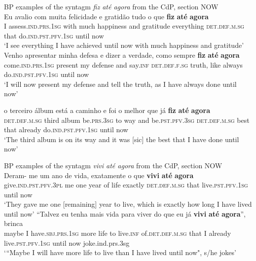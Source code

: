\documentclass[output=paper,colorlinks,citecolor=brown]{langscibook}
\begin{document}
\ea\label{ex:rb22}
    BP examples of the syntagm \textit{fiz até agora} from the CdP, section NOW\\
 \ea\label{ex:rb22a}
 \gll Eu avalio com muita felicidade e gratidão tudo o que \textbf{fiz} \textbf{até} \textbf{agora}\\
 I assess.\textsc{ind.prs.1sg} with much happiness and gratitude everything \textsc{det.def.m.sg} that do.\textsc{ind.pst.pfv.1sg} until now\\
 \glt ‘I see everything I have achieved until now with much happiness and gratitude’\\
  \ex\label{ex:rb22b}
  \gll Venho apresentar minha defesa e dizer a verdade, como sempre \textbf{fiz} \textbf{até} \textbf{agora}\\
  come.\textsc{ind.prs.1sg} present my defense and say.\textsc{inf} \textsc{det.def.f.sg} truth, like always do.\textsc{ind.pst.pfv.1sg} until now\\
  \glt ‘I will now present my defense and tell the truth, as I have always done until now’

   \ex\label{ex:rb22c}
   \gll o terceiro álbum está a caminho e foi o melhor que já \textbf{fiz} \textbf{até} \textbf{agora}\\
   \textsc{det.def.m.sg} third album be.\textsc{prs.3sg} to way and be.\textsc{pst.pfv.3sg} \textsc{det.def.m.sg} best that already do.\textsc{ind.pst.pfv.1sg} until now\\
   \glt ‘The third album is on its way and it was [sic] the best that I have done until now’
 \z
\z

\ea\label{ex:rb23}
BP examples of the syntagm \textit{vivi até agora} from the CdP, section NOW\\
 \ea\label{ex:rb23a}
  \gll Deram- me um ano de vida, exatamente o que \textbf{vivi} \textbf{até} \textbf{agora}\\
  give.\textsc{ind.pst.pfv.3pl} me one year of life exactly \textsc{det.def.m.sg} that live.\textsc{pst.pfv.1sg} until now\\
  \glt ‘They gave me one [remaining] year to live, which is exactly how long I have lived until now’
  \pagebreak
  \ex\label{ex:rb23b}
  \gll “Talvez eu tenha mais vida para viver do que eu já \textbf{vivi} \textbf{até} \textbf{agora}”, brinca\\
  maybe I have.\textsc{sbj.prs.1sg} more life to live.\textsc{inf} of.\textsc{det.def.m.sg} that I already live.\textsc{pst.pfv.1sg} until now joke.ind.prs.3sg\\
  \glt ‘“Maybe I will have more life to live than I have lived until now", s/he jokes’
\z
\z
\end{document}
